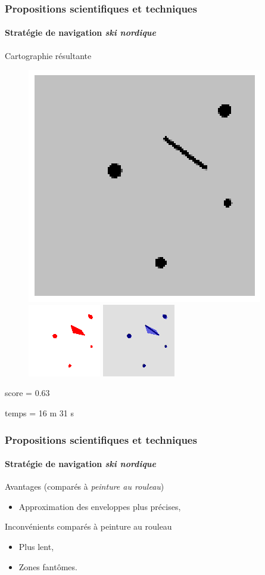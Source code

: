 \documentclass{beamer}
\begin{document}
			\begin{frame}
				\frametitle{Propositions scientifiques et techniques}
				\framesubtitle{Stratégie de navigation \textit{ski nordique}}
				Cartographie résultante
				\begin{figure}
					\centering
					\includegraphics[width=0.3\linewidth]{graphics/test_05_flip.png}
					\includegraphics[width=0.3\linewidth]{graphics/occupancy_grid_example_sn.png}
					\includegraphics[width=0.3\linewidth]{graphics/both_example_sn.png}
				\end{figure}
				score = 0.63

				temps = 16 m 31 s
			\end{frame}
			\begin{frame}
				\frametitle{Propositions scientifiques et techniques}
				\framesubtitle{Stratégie de navigation \textit{ski nordique}}
				\begin{exampleblock}{Avantages (comparés à \textit{peinture au rouleau})}
					\begin{itemize}
						\item Approximation des enveloppes plus précises,
					\end{itemize}
				\end{exampleblock}
				\begin{alertblock}{Inconvénients comparés à peinture au rouleau}
					\begin{itemize}
						\item Plus lent,
						\item Zones fantômes.
					\end{itemize}
				\end{alertblock}
			\end{frame}
\end{document}
